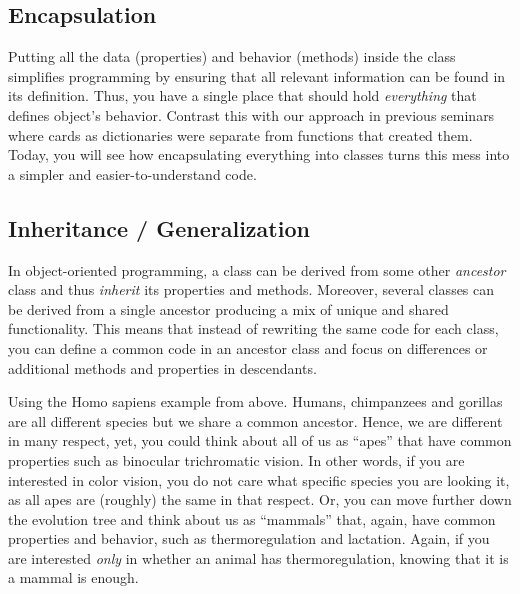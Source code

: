 \documentclass[
]{book}
\begin{document}
\hypertarget{encapsulation}{%
\subsection{Encapsulation}\label{encapsulation}}

Putting all the data (properties) and behavior (methods) inside the class simplifies programming by ensuring that all relevant information can be found in its definition. Thus, you have a single place that should hold \emph{everything} that defines object's behavior. Contrast this with our approach in previous seminars where cards as dictionaries were separate from functions that created them. Today, you will see how encapsulating everything into classes turns this mess into a simpler and easier-to-understand code.

\hypertarget{inheritance-generalization}{%
\subsection{Inheritance / Generalization}\label{inheritance-generalization}}

In object-oriented programming, a class can be derived from some other \emph{ancestor} class and thus \emph{inherit} its properties and methods. Moreover, several classes can be derived from a single ancestor producing a mix of unique and shared functionality. This means that instead of rewriting the same code for each class, you can define a common code in an ancestor class and focus on differences or additional methods and properties in descendants.

Using the Homo sapiens example from above. Humans, chimpanzees and gorillas are all different species but we share a common ancestor. Hence, we are different in many respect, yet, you could think about all of us as ``apes'' that have common properties such as binocular trichromatic vision. In other words, if you are interested in color vision, you do not care what specific species you are looking it, as all apes are (roughly) the same in that respect. Or, you can move further down the evolution tree and think about us as ``mammals'' that, again, have common properties and behavior, such as thermoregulation and lactation. Again, if you are interested \emph{only} in whether an animal has thermoregulation, knowing that it is a mammal is enough.
\end{document}
